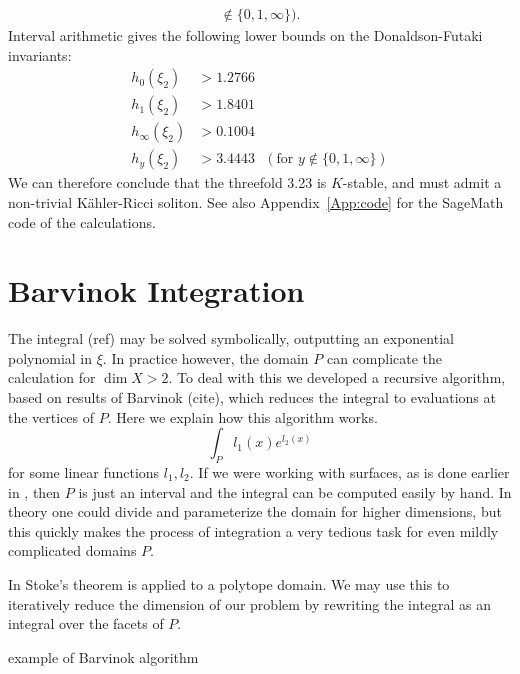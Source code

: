 \begin{example}
{\begin{align*}
\not \in \{0,1,\infty\} ).
\end{align*}}
Interval arithmetic gives the following lower bounds on the Donaldson-Futaki invariants:
\begin{align*}
h_0(\xi_2) &> 1.2766 \\
h_1(\xi_2) &> 1.8401 \\
h_\infty(\xi_2) &> 0.1004 \\
h_y(\xi_2) &> 3.4443 \ \ \  ( \text{for } y 
\not \in \{0,1,\infty\} )
\end{align*}
We can therefore conclude that the threefold 3.23 is \(K\)-stable, and must admit a non-trivial K\"ahler-Ricci soliton. See also Appendix~\ref{App:code} for the SageMath code of the calculations.
\end{example}

\section{Barvinok Integration}
The integral (ref) may be solved symbolically, outputting an exponential polynomial in \(\xi\). In practice however, the domain \(P\) can complicate the calculation for \(\dim X > 2\). To deal with this we developed a recursive algorithm, based on results of Barvinok (cite), which reduces the integral to evaluations at the vertices of \(P\). Here we explain how this algorithm works.
\[
\int_{P} l_1(x) e^{l_2(x)}
\]
for some linear functions \(l_1,l_2\). If we were working with surfaces, as is done earlier in \cite{cable2018classification}, then \(P\) is just an interval and the integral can be computed easily by hand. In theory one could divide and parameterize the domain for higher dimensions, but this quickly makes the process of integration a very tedious task for even mildly complicated domains \(P\).

In \cite{barvinok} Stoke's theorem is applied to a polytope domain. We may use this to iteratively reduce the dimension of our problem by rewriting the integral as an integral over the facets of \(P\).

\begin{example}
example of Barvinok algorithm
\end{example}	